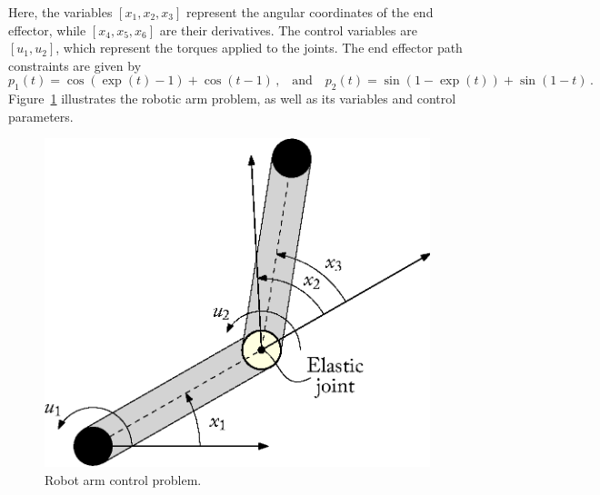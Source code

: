 %
Here, the variables $[x_1, x_2, x_3]$ represent the angular coordinates of the end effector, while $[x_4, x_5, x_6]$ are their derivatives. The control variables are $[u_1, u_2]$, which represent the torques applied to the joints. The end effector path constraints are given by
%
\begin{equation}
  p_1(t) = \cos(\exp(t) - 1) + \cos(t - 1) \, \text{,}
  \quad \text{and} \quad
  p_2(t) = \sin(1 - \exp(t)) + \sin(1 - t) \, \text{.}
\end{equation}
%
Figure~\ref{chap5:fig:robotic_arm} illustrates the robotic arm problem, as well as its variables and control parameters.

\begin{figure}[htb]
  \centering
  \includegraphics[width=0.4\linewidth]{figures/chapter_5/robotic_arm.eps}
  \caption{Robot arm control problem.}
  \label{chap5:fig:robotic_arm}
\end{figure}

